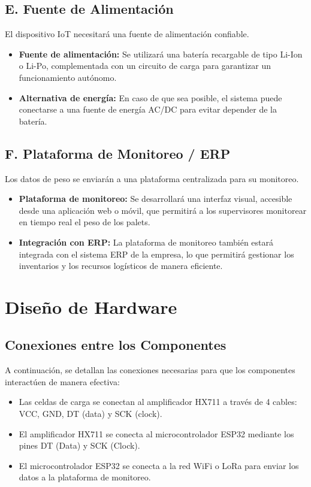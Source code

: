 \documentclass{article}
\begin{document}
\subsection{E. Fuente de Alimentación}
El dispositivo IoT necesitará una fuente de alimentación confiable.

\begin{itemize}
    \item \textbf{Fuente de alimentación:} Se utilizará una batería recargable de tipo Li-Ion o Li-Po, complementada con un circuito de carga para garantizar un funcionamiento autónomo.
    \item \textbf{Alternativa de energía:} En caso de que sea posible, el sistema puede conectarse a una fuente de energía AC/DC para evitar depender de la batería.
\end{itemize}

\subsection{F. Plataforma de Monitoreo / ERP}
Los datos de peso se enviarán a una plataforma centralizada para su monitoreo.

\begin{itemize}
    \item \textbf{Plataforma de monitoreo:} Se desarrollará una interfaz visual, accesible desde una aplicación web o móvil, que permitirá a los supervisores monitorear en tiempo real el peso de los palets.
    \item \textbf{Integración con ERP:} La plataforma de monitoreo también estará integrada con el sistema ERP de la empresa, lo que permitirá gestionar los inventarios y los recursos logísticos de manera eficiente.
\end{itemize}

\section{Diseño de Hardware}

\subsection{Conexiones entre los Componentes}
A continuación, se detallan las conexiones necesarias para que los componentes interactúen de manera efectiva:

\begin{itemize}
    \item Las celdas de carga se conectan al amplificador HX711 a través de 4 cables: VCC, GND, DT (data) y SCK (clock).
    \item El amplificador HX711 se conecta al microcontrolador ESP32 mediante los pines DT (Data) y SCK (Clock).
    \item El microcontrolador ESP32 se conecta a la red WiFi o LoRa para enviar los datos a la plataforma de monitoreo.
\end{itemize}
\end{document}
